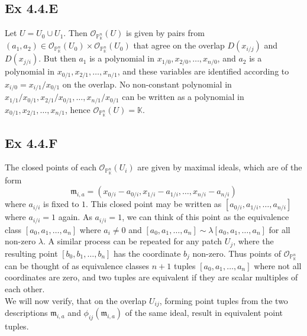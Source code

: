 \documentclass{article}
\theoremstyle{definition}
\newcommand{\K}{\mathbb{K}}
\renewcommand{\P}{\mathbb{P}}
\newcommand{\oo}{\mathcal{O}}
\newcommand{\oop}[2]{\oo_{\P^{#1}_{#2}}}
\begin{document}
\subsection*{Ex 4.4.E}

Let $U = U_0 \cup U_1$. Then $\oop{n}{\K}(U)$ is given by pairs from $(a_1,
a_2) \in \oop{n}{\K}(U_0) \times \oop{n}{\K}(U_0)$ that agree on the overlap
$D(x_{i/j})$ and $D(x_{j/i})$. But then $a_1$ is a polynomial in 
$x_{1/0}, x_{2/0}, \ldots, x_{n/0}$, and $a_2$ is a polynomial in 
$x_{0/1}, x_{2/1}, \ldots, x_{n/1}$, and these variables are identified 
according to $x_{i/0} = x_{i/1}/x_{0/1}$ on the overlap. No non-constant
polynomial in $x_{1/1}/x_{0/1}, x_{2/1}/x_{0/1}, \ldots, x_{n/1}/x_{0/1}$
can be written as a polynomial in $x_{0/1}, x_{2/1}, \ldots, x_{n/1}$,
hence $\oop{n}{\K}(U) = \K$.

\subsection*{Ex 4.4.F}

The closed points of each $\oop{n}{\K}(U_i)$ are given by maximal ideals, which
are of the form
\[
	\mathfrak{m}_{i, a} = (x_{0/i} - a_{0/i}, x_{1/i} - a_{1/i}, \ldots, x_{n/i} -
	a_{n/i})
\] 
where $a_{i/i}$ is fixed to $1$. This closed point may be written as $[a_{0/i},
a_{1/i}, \ldots, a_{n/i}]$ where $a_{i/i} = 1$ again. As $a_{i/i} = 1$, we can
think of this point as the equivalence class $[a_{0}, a_{1}, \ldots, a_{n}]$
where $a_i \not = 0$ and $[a_{0}, a_{1}, \ldots, a_{n}] \sim \lambda[a_{0},
a_{1}, \ldots, a_{n}]$ for all non-zero $\lambda$. A similar process can be
repeated for any patch $U_j$, where the resulting point $[b_{0}, b_{1}, \ldots,
b_{n}]$ has the coordinate $b_j$ non-zero. Thus points of $\oop{n}{\K}$ can be
thought of as equivalence classes $n + 1$ tuples $[a_{0}, a_{1}, \ldots,
a_{n}]$ where not all coordinates are zero, and two tuples are equivalent if
they are scalar multiples of each other. \\

We will now verify, that on the overlap $U_{ij}$, forming point tuples from the
two descriptions $\mathfrak{m}_{i, a}$ and $\phi_{ij}(\mathfrak{m}_{i, a})$ of
the same ideal, result in equivalent point tuples. \\
\end{document}
